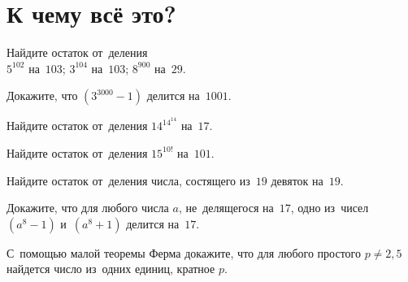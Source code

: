 
\section*{К чему всё это?}


\begin{problems}

\item
Найдите остаток от~деления
\\
\subproblem $5^{102}$ на~$103$;
\quad
\subproblem $3^{104}$ на~$103$;
\quad
\subproblem $8^{900}$ на~$29$.

\item
Докажите, что $(3^{3000} - 1)$ делится на~$1001$.

\item
Найдите остаток от~деления $14^{14^{14}}$ на~$17$.

\item
Найдите остаток от~деления $15^{10!}$ на~$101$.

\item
Найдите остаток от~деления числа, состящего из~$19$ девяток на~$19$.

\item
Докажите, что для любого числа $a$, не~делящегося на~$17$, одно из~чисел
$(a^8 - 1)$ и~$(a^8 + 1)$ делится на~$17$. 

\item
С~помощью малой теоремы Ферма докажите, что для любого простого $p \neq 2, 5$
найдется число из~одних единиц, кратное $p$.

\end{problems}

